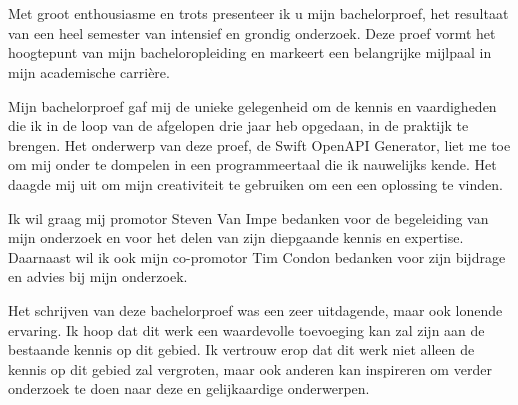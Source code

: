 
\chapter*{}%
\label{ch:voorwoord}

Met groot enthousiasme en trots presenteer ik u mijn bachelorproef, het resultaat van een heel semester van intensief en grondig onderzoek. Deze proef vormt het hoogtepunt van mijn bacheloropleiding en markeert een belangrijke mijlpaal in mijn academische carrière.

Mijn bachelorproef gaf mij de unieke gelegenheid om de kennis en vaardigheden die ik in de loop van de afgelopen drie jaar heb opgedaan, in de praktijk te brengen. Het onderwerp van deze proef, de Swift OpenAPI Generator, liet me toe om mij onder te dompelen in een programmeertaal die ik nauwelijks kende. Het daagde mij uit om mijn creativiteit te gebruiken om een een oplossing te vinden. 

Ik wil graag mij promotor Steven Van Impe bedanken voor de begeleiding van mijn onderzoek en voor het delen van zijn diepgaande kennis en expertise. Daarnaast wil ik ook mijn co-promotor Tim Condon bedanken voor zijn bijdrage en advies bij mijn onderzoek. 

Het schrijven van deze bachelorproef was een zeer uitdagende, maar ook lonende ervaring. Ik hoop dat dit werk een waardevolle toevoeging kan zal zijn aan de bestaande kennis op dit gebied. Ik vertrouw erop dat dit werk niet alleen de kennis op dit gebied zal vergroten, maar ook anderen kan inspireren om verder onderzoek te doen naar deze en gelijkaardige onderwerpen.
